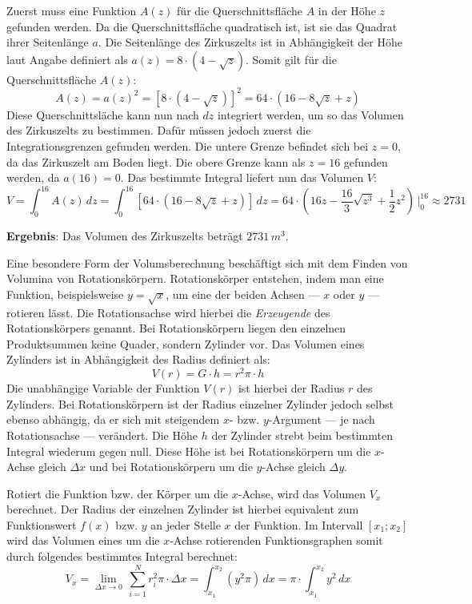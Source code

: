 Zuerst muss eine Funktion $A(z)$ f\"{u}r die Querschnittsfl\"{a}che $A$ in der H\"{o}he $z$ gefunden werden. Da die Querschnittsfl\"{a}che quadratisch ist, ist sie das Quadrat ihrer Seitenl\"{a}nge $a$. Die Seitenl\"{a}nge des Zirkuszelts ist in Abh\"{a}ngigkeit der H\"{o}he laut Angabe definiert als $a(z) = 8 \cdot (4 - \sqrt{z})$. Somit gilt f\"{u}r die Querschnittsfl\"{a}che $A(z)$: $$A(z) = a(z)^2 = \left[ 8 \cdot (4 - \sqrt{z}) \right]^2 = 64 \cdot (16 -8\sqrt{z} + z)$$ Diese Querschnittsl\"{a}che kann nun nach $dz$ integriert werden, um so das Volumen des Zirkuszelts zu bestimmen. Daf\"{u}r m\"{u}ssen jedoch zuerst die Integrationsgrenzen gefunden werden. Die untere Grenze befindet sich bei $z = 0$, da das Zirkuszelt am Boden liegt. Die obere Grenze kann als $z = 16$ gefunden werden, da $a(16) = 0$. Das bestimmte Integral liefert nun das Volumen $V$: $$V = \int_{0}^{16} A(z) \, dz = \int_{0}^{16} \left[ 64 \cdot (16 -8\sqrt{z} + z) \right] \, dz = 64 \cdot \left( 16z -\frac{16}{3}\sqrt{z^3} + \frac{1}{2}z^2 \right) \, \bigg|_{0}^{16} \approx 2731$$

\textbf{Ergebnis}: Das Volumen des Zirkuszelts betr\"{a}gt $2731 \, m^3$.


Eine besondere Form der Volumsberechnung besch\"{a}ftigt sich mit dem Finden von Volumina von Rotationsk\"{o}rpern. Rotationsk\"{o}rper entstehen, indem man eine Funktion, beispielsweise $y = \sqrt{x}$, um eine der beiden Achsen --- $x$ oder $y$ --- rotieren l\"{a}sst. Die Rotationsachse wird hierbei die \emph{Erzeugende} des Rotationsk\"{o}rpers genannt. Bei Rotationsk\"{o}rpern liegen den einzelnen Produktsummen keine Quader, sondern Zylinder vor. Das Volumen eines Zylinders ist in Abh\"{a}ngigkeit des Radius definiert als: $$V(r) = G \cdot h = r^2 \pi \cdot h$$ Die unabh\"{a}ngige Variable der Funktion $V(r)$ ist hierbei der Radius $r$ des Zylinders. Bei Rotationsk\"{o}rpern ist der Radius einzelner Zylinder jedoch selbst ebenso abh\"{a}ngig, da er sich mit steigendem $x$- bzw. $y$-Argument --- je nach Rotationsachse --- ver\"{a}ndert. Die H\"{o}he $h$ der Zylinder strebt beim bestimmten Integral wiederum gegen null. Diese H\"{o}he ist bei Rotationsk\"{o}rpern um die $x$-Achse gleich $\Delta x$ und bei Rotationsk\"{o}rpern um die $y$-Achse gleich $\Delta y$.

Rotiert die Funktion bzw. der K\"{o}rper um die $x$-Achse, wird das Volumen $V_x$ berechnet. Der Radius der einzelnen Zylinder ist hierbei equivalent zum Funktionswert $f(x)$ bzw. $y$ an jeder Stelle $x$ der Funktion. Im Intervall $[x_1 ; x_2 ]$ wird das Volumen eines um die $x$-Achse rotierenden Funktionsgraphen somit durch folgendes bestimmtes Integral berechnet: $$V_x = \lim_{\Delta x \rightarrow 0} \, \sum_{i=1}^{N} r_i^2 \pi \cdot \Delta x = \int_{x_1}^{x_2} (y^2 \pi) \, dx = \pi \cdot \int_{x_1}^{x_2} y^2 \, dx$$ 

